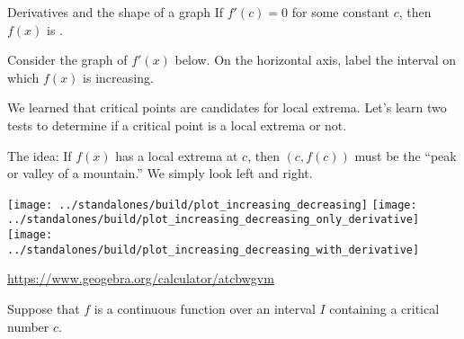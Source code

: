 \documentclass[../main.tex]{subfiles}
\begin{document}
\begin{lesson}{Derivatives and the shape of a graph}
  \faStar{} If \(f'(c) = 0\) for some constant \(c\), then \(f(x)\) is \underline{\hspace{3.5in}}.

  \begin{example}
    Consider the graph of \(f'(x)\) below. On the horizontal axis, label the interval on which \(f(x)\) is increasing. 

    \begin{center}
    \end{center}
  \end{example}

  We learned that critical points are candidates for local extrema. Let's learn two tests to determine if a critical point is a local extrema or not.

  The idea: If \(f(x)\) has a local extrema at \(c\), then \((c,f(c))\) must be the ``peak or valley of a mountain.''  We simply look left and right.
  \begin{center}
    \texttt{[image: ../standalones/build/plot\_increasing\_decreasing]}
    \hfill
    \texttt{[image: ../standalones/build/plot\_increasing\_decreasing\_only\_derivative]}
    \hfill
    \texttt{[image: ../standalones/build/plot\_increasing\_decreasing\_with\_derivative]}

    \url{https://www.geogebra.org/calculator/atcbwgvm}
  \end{center}
  \clearpage

  \begin{mdframed}[style=withref-compact]
    Suppose that \(f\) is a continuous function over an interval \(I\) containing a critical number \(c\). 


\end{mdframed}
\end{lesson}
\end{document}
